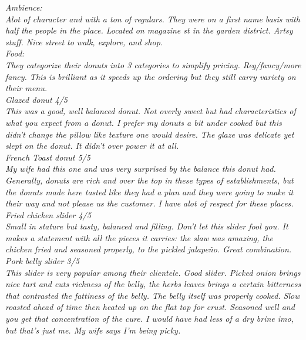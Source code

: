 \documentclass{article}
\begin{document}
  \textit{Ambience:} \\
  \textit{Alot of character and with a ton of regulars. They were on a first
  name basis with half the people in the place. Located on magazine st in the
  garden district. Artsy stuff. Nice street to walk, explore, and shop.} \\

  \textit{Food:} \\
  \textit{They categorize their donuts into 3 categories to simplify pricing.
  Reg/fancy/more fancy. This is brilliant as it speeds up the ordering but they
  still carry variety on their menu.} \\

  \textit{Glazed donut 4/5} \\
  \textit{This was a good, well balanced donut. Not overly sweet but had
  characteristics of what you expect from a donut. I prefer my donuts a bit
  under cooked but this didn't change the pillow like texture one would desire.
  The glaze was delicate yet slept on the donut. It didn't over power it at
  all.} \\

  \textit{French Toast donut 5/5} \\
  \textit{My wife had this one and was very surprised by the balance this donut
  had. Generally, donuts are rich and over the top in these types of
  establishments, but the donuts made here tasted like they had a plan and they
  were going to make it their way and not please us the customer. I have alot
  of respect for these places.} \\

  \textit{Fried chicken slider 4/5} \\
  \textit{Small in stature but tasty, balanced and filling. Don't let this
  slider fool you. It makes a statement with all the pieces it carries: the
  slaw was amazing, the chicken fried and seasoned properly, to the pickled
  jalapeño. Great combination.} \\

  \textit{Pork belly slider 3/5} \\
  \textit{This slider is very popular among their clientele. Good slider.
  Picked onion brings nice tart and cuts richness of the belly, the herbs
  leaves brings a certain bitterness that contrasted the fattiness of the
  belly. The belly itself was properly cooked. Slow roasted ahead of time then
  heated up on the flat top for crust. Seasoned well and you get that
  concentration of the cure. I would have had less of a dry brine imo, but
  that's just me. My wife says I'm being picky.} \\
\end{document}
